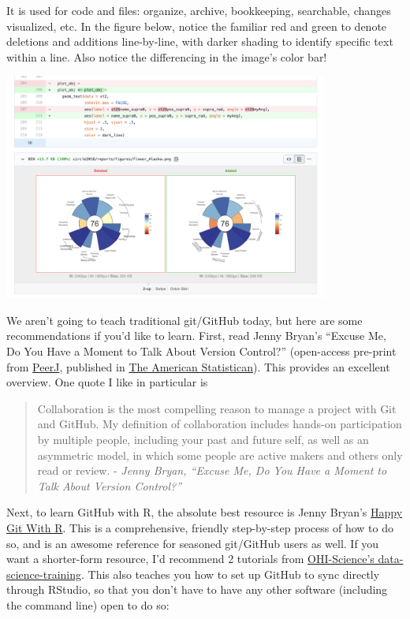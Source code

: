 \documentclass[
  letterpaper,
  DIV=11,
  numbers=noendperiod]{scrreprt}
\begin{document}
It is used for code and files: organize, archive, bookkeeping,
searchable, changes visualized, etc. In the figure below, notice the
familiar red and green to denote deletions and additions line-by-line,
with darker shading to identify specific text within a line. Also notice
the differencing in the image's color bar!

\includegraphics[width=0.8\textwidth,height=\textheight]{./img/github-differencing.png}

We aren't going to teach traditional git/GitHub today, but here are some
recommendations if you'd like to learn. First, read Jenny Bryan's
``Excuse Me, Do You Have a Moment to Talk About Version Control?''
(open-access pre-print from
\href{https://peerj.com/preprints/3159/}{PeerJ}, published in
\href{https://www.tandfonline.com/doi/full/10.1080/00031305.2017.1399928}{The
American Statistican}). This provides an excellent overview. One quote I
like in particular is

\begin{quote}
Collaboration is the most compelling reason to manage a project with Git
and GitHub. My definition of collaboration includes hands-on
participation by multiple people, including your past and future self,
as well as an asymmetric model, in which some people are active makers
and others only read or review. - \emph{Jenny Bryan, ``Excuse Me, Do You
Have a Moment to Talk About Version Control?''}
\end{quote}

Next, to learn GitHub with R, the absolute best resource is Jenny
Bryan's \href{https://happygitwithr.com/}{Happy Git With R}. This is a
comprehensive, friendly step-by-step process of how to do so, and is an
awesome reference for seasoned git/GitHub users as well. If you want a
shorter-form resource, I'd recommend 2 tutorials from
\href{http://ohi-science.org/data-science-training/}{OHI-Science's
data-science-training}. This also teaches you how to set up GitHub to
sync directly through RStudio, so that you don't have to have any other
software (including the command line) open to do so:
\end{document}
